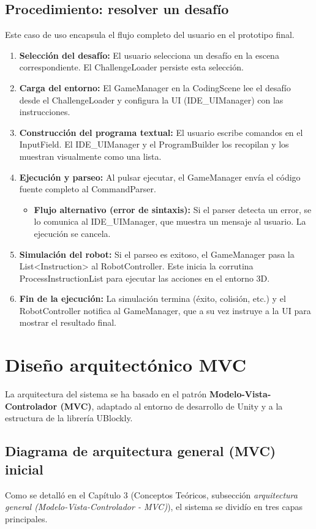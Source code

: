 \subsection{Procedimiento: resolver un desafío}
Este caso de uso encapsula el flujo completo del usuario en el prototipo final.
\begin{enumerate}
	\item \textbf{Selección del desafío:} El usuario selecciona un desafío en la escena correspondiente. El ChallengeLoader persiste esta selección.
	\item \textbf{Carga del entorno:} El GameManager en la CodingScene lee el desafío desde el ChallengeLoader y configura la UI (IDE\_UIManager) con las instrucciones.
	\item \textbf{Construcción del programa textual:} El usuario escribe comandos en el InputField. El IDE\_UIManager y el ProgramBuilder los recopilan y los muestran visualmente como una lista.
	\item \textbf{Ejecución y parseo:} Al pulsar ejecutar, el GameManager envía el código fuente completo al CommandParser.
	\begin{itemize}
		\item \textbf{Flujo alternativo (error de sintaxis):} Si el parser detecta un error, se lo comunica al IDE\_UIManager, que muestra un mensaje al usuario. La ejecución se cancela.
	\end{itemize}
	\item \textbf{Simulación del robot:} Si el parseo es exitoso, el GameManager pasa la List<Instruction> al RobotController. Este inicia la corrutina ProcessInstructionList para ejecutar las acciones en el entorno 3D.
	\item \textbf{Fin de la ejecución:} La simulación termina (éxito, colisión, etc.) y el RobotController notifica al GameManager, que a su vez instruye a la UI para mostrar el resultado final.
\end{enumerate}

\section{Diseño arquitectónico MVC }
La arquitectura del sistema se ha basado en el patrón \textbf{Modelo-Vista-Controlador (MVC)}, adaptado al entorno de desarrollo de Unity y a la estructura de la librería UBlockly.

\subsection{Diagrama de arquitectura general (MVC) inicial }
Como se detalló en el Capítulo 3 (Conceptos Teóricos, subsección \textit{arquitectura general (Modelo-Vista-Controlador - MVC)}), el sistema se dividío en tres capas principales. 



